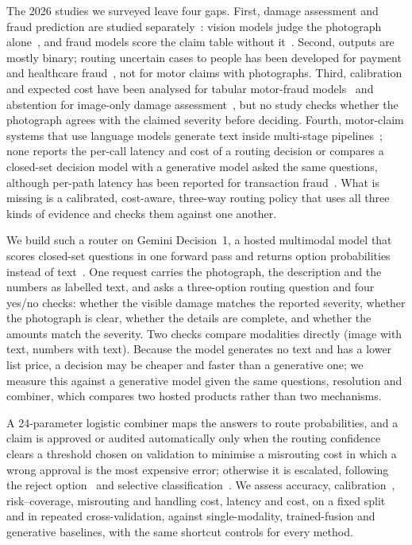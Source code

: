 The 2026 studies we surveyed leave four gaps. First, damage assessment and fraud prediction are studied separately~\cite{subhash2026}: vision models judge the photograph alone~\cite{ouf2026,li2026part,dalal2026,cheng2026}, and fraud models score the claim table without it~\cite{bekkaye2026,ebinezer2026,vandervorst2026}. Second, outputs are mostly binary; routing uncertain cases to people has been developed for payment and healthcare fraud~\cite{liu2026daunt,sourav2026,dadi2026,syed2026}, not for motor claims with photographs. Third, calibration and expected cost have been analysed for tabular motor-fraud models~\cite{bekkaye2026} and abstention for image-only damage assessment~\cite{shao2026}, but no study checks whether the photograph agrees with the claimed severity before deciding. Fourth, motor-claim systems that use language models generate text inside multi-stage pipelines~\cite{arconzo2026,mitrenga2026,phuengpanyaloet2026,hatzesberger2026}; none reports the per-call latency and cost of a routing decision or compares a closed-set decision model with a generative model asked the same questions, although per-path latency has been reported for transaction fraud~\cite{sourav2026}. What is missing is a calibrated, cost-aware, three-way routing policy that uses all three kinds of evidence and checks them against one another.

We build such a router on Gemini Decision~1, a hosted multimodal model that scores closed-set questions in one forward pass and returns option probabilities instead of text~\cite{google2026decisions}. One request carries the photograph, the description and the numbers as labelled text, and asks a three-option routing question and four yes/no checks: whether the visible damage matches the reported severity, whether the photograph is clear, whether the details are complete, and whether the amounts match the severity. Two checks compare modalities directly (image with text, numbers with text). Because the model generates no text and has a lower list price, a decision may be cheaper and faster than a generative one; we measure this against a generative model given the same questions, resolution and combiner, which compares two hosted products rather than two mechanisms.

A 24-parameter logistic combiner maps the answers to route probabilities, and a claim is approved or audited automatically only when the routing confidence clears a threshold chosen on validation to minimise a misrouting cost in which a wrong approval is the most expensive error; otherwise it is escalated, following the reject option~\cite{chow1970} and selective classification~\cite{geifman2017selective}. We assess accuracy, calibration~\cite{guo2017calibration,naeini2015,brier1950}, risk--coverage, misrouting and handling cost, latency and cost, on a fixed split and in repeated cross-validation, against single-modality, trained-fusion and generative baselines, with the same shortcut controls for every method.


